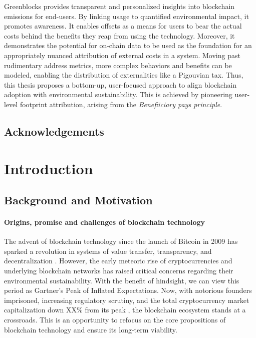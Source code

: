\documentclass[11pt]{report}
\begin{document}
Greenblocks provides transparent and personalized insights into blockchain emissions for end-users. By linking usage to quantified environmental impact, it promotes awareness. It enables offsets as a means for users to bear the actual costs behind the benefits they reap from using the technology. Moreover, it demonstrates the potential for on-chain data to be used as the foundation for an appropriately nuanced attribution of external costs in a system. Moving past rudimentary address metrics, more complex behaviors and benefits can be modeled, enabling the distribution of externalities like a Pigouvian tax. Thus, this thesis proposes a bottom-up, user-focused approach to align blockchain adoption with environmental sustainability. This is achieved by pioneering user-level footprint attribution, arising from the \textit{Benefiiciary pays principle}.



\newpage
\section*{Acknowledgements}
\tableofcontents



\chapter{Introduction}

\section{Background and Motivation}
\subsubsection*{Origins, promise and challenges of blockchain technology}
The advent of blockchain technology since the launch of Bitcoin in 2009 has sparked a revolution in systems of value transfer, transparency, and decentralization \cite{nakamotoBitcoinPeertopeerElectronic2008}. However, the early meteoric rise of cryptocurrencies and underlying blockchain networks has raised critical concerns regarding their environmental sustainability. With the benefit of hindsight, we can view this period as Gartner's Peak of Inflated Expectations. Now, with notorious founders imprisoned, increasing regulatory scrutiny, and the total cryptocurrency market capitalization down
XX\% from its peak , the blockchain ecosystem stands at a crossroads. This is an opportunity to refocus on the core propositions of blockchain technology and ensure its long-term viability.
\end{document}
